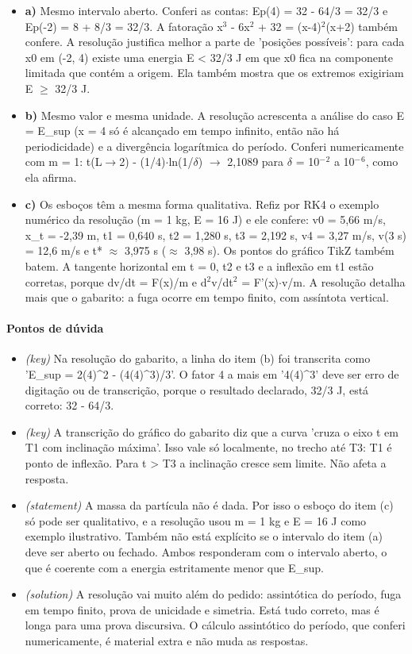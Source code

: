 \documentclass{article}%
\begin{document}
\begin{itemize}%
\item%
\textbf{a)} Mesmo intervalo aberto. Conferi as contas: Ep(4) = 32 {-} 64/3 = 32/3 e Ep({-}2) = 8 + 8/3 = 32/3. A fatoração x$^3$ {-} 6x$^2$ + 32 = (x{-}4)$^2$(x+2) também confere. A resolução justifica melhor a parte de 'posições possíveis': para cada x0 em ({-}2, 4) existe uma energia E < 32/3 J em que x0 fica na componente limitada que contém a origem. Ela também mostra que os extremos exigiriam E $\geq$ 32/3 J.%
\item%
\textbf{b)} Mesmo valor e mesma unidade. A resolução acrescenta a análise do caso E = E\_sup (x = 4 só é alcançado em tempo infinito, então não há periodicidade) e a divergência logarítmica do período. Conferi numericamente com m = 1: t(L$\to$2) {-} (1/4)$\cdot$ln(1/$\delta$) $\to$ 2,1089 para $\delta$ = 10$^{-}$$^2$ a 10$^{-}$$^{6}$, como ela afirma.%
\item%
\textbf{c)} Os esboços têm a mesma forma qualitativa. Refiz por RK4 o exemplo numérico da resolução (m = 1 kg, E = 16 J) e ele confere: v0 = 5,66 m/s, x\_t = {-}2,39 m, t1 = 0,640 s, t2 = 1,280 s, t3 = 2,192 s, v4 = 3,27 m/s, v(3 s) = 12,6 m/s e t* $\approx$ 3,975 s ($\approx$ 3,98 s). Os pontos do gráfico TikZ também batem. A tangente horizontal em t = 0, t2 e t3 e a inflexão em t1 estão corretas, porque dv/dt = F(x)/m e d$^2$v/dt$^2$ = F'(x)$\cdot$v/m. A resolução detalha mais que o gabarito: a fuga ocorre em tempo finito, com assíntota vertical.%
\end{itemize}%
\paragraph{Pontos de dúvida}%
\begin{itemize}%
\item%
\textit{(key)} Na resolução do gabarito, a linha do item (b) foi transcrita como 'E\_sup = 2(4)\^{}2 {-} (4(4)\^{}3)/3'. O fator 4 a mais em '4(4)\^{}3' deve ser erro de digitação ou de transcrição, porque o resultado declarado, 32/3 J, está correto: 32 {-} 64/3.%
\item%
\textit{(key)} A transcrição do gráfico do gabarito diz que a curva 'cruza o eixo t em T1 com inclinação máxima'. Isso vale só localmente, no trecho até T3: T1 é ponto de inflexão. Para t > T3 a inclinação cresce sem limite. Não afeta a resposta.%
\item%
\textit{(statement)} A massa da partícula não é dada. Por isso o esboço do item (c) só pode ser qualitativo, e a resolução usou m = 1 kg e E = 16 J como exemplo ilustrativo. Também não está explícito se o intervalo do item (a) deve ser aberto ou fechado. Ambos responderam com o intervalo aberto, o que é coerente com a energia estritamente menor que E\_sup.%
\item%
\textit{(solution)} A resolução vai muito além do pedido: assintótica do período, fuga em tempo finito, prova de unicidade e simetria. Está tudo correto, mas é longa para uma prova discursiva. O cálculo assintótico do período, que conferi numericamente, é material extra e não muda as respostas.%
\end{itemize}%
\end{document}
